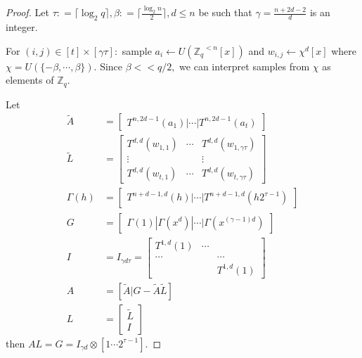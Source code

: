 \documentclass[11pt]{article}
\newcommand{\poly}[2]{{#1}^{<#2}[x]}
\newcommand{\Z}{\mathbb{Z}}
\newcommand{\sample}{\leftarrow}
\begin{document}
     \begin{proof}
     Let $\tau: = \lceil \log_2 q \rceil, \beta : = \lceil \frac{\log_2 n}{2}\rceil, d \leq n$ be such that $\gamma = \frac{n+2d-2}{d}$ is an integer.
     
     For $ (i,j) \in [t] \times [\gamma \tau] :$ sample $a_i \sample U(\poly{\mathbb{Z}_q}{n})$ and $w_{i,j} \sample \chi^{d}[x]$ where $\chi=U(\{-\beta, \cdots, \beta \}).$
     Since $\beta << q/2,$ we can interpret samples from $\chi$ as elements of $\Z_q.$ 
       
       Let 
       \begin{equation} \label{eq:matPoly}
           \begin{split}
               \tilde{A} &=\begin{bmatrix} T^{n,2d-1}(a_1) | \cdots | T^{n,2d-1} (a_t)\end{bmatrix}\\
               \tilde{L} &= \begin{bmatrix} T^{d, d}(w_{1,1}) & \cdots &  T^{d, d}(w_{1,\gamma \tau}) \\ \vdots &  & \vdots \\ T^{d, d}(w_{t,1}) & \cdots &  T^{d, d}(w_{t,\gamma \tau})\end{bmatrix}\\ 
               \Gamma(h) &= \begin{bmatrix}T^{n+d-1,d}(h) | \cdots | T^{n+d-1,d}(h2^{\tau-1} ) \end{bmatrix}\\ 
     G &=\begin{bmatrix}\Gamma(1) | \Gamma(x^d) | \cdots | \Gamma(x^{(\gamma-1) d}) \end{bmatrix} \\
     I &= I_{ \gamma d \tau} = \begin{bmatrix} T^{1,d}(1) & \cdots  &  \\ \cdots & & \cdots \\  & & T^{1,d}(1) \end{bmatrix}\\
     A &= [\tilde{A} | G - \tilde{A} \tilde{L}]\\
     L &= \begin{bmatrix} \tilde{L} \\ I \end{bmatrix}
           \end{split}
       \end{equation} 
     then $A L = G =I_{\gamma d}\otimes [1 \cdots 2^{\tau-1}].$ 
     

\end{proof}
\end{document}
